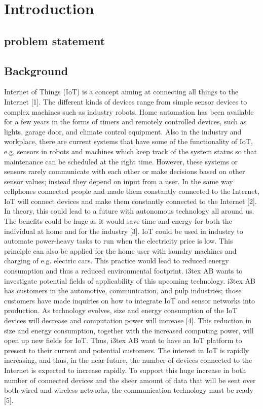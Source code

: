 \section{Introduction}

\subsection{problem statement}


\subsection{Background}

Internet of Things (IoT) is a concept aiming at connecting all things to the Internet [1].
The different kinds of devices range from simple sensor devices to complex machines such as industry robots.
Home automation has been available for a few years in the forms of timers and remotely controlled devices,
	such as lights,
	garage door,
	and climate control equipment.
Also in the industry and workplace,
	there are current systems that have some of the functionality of IoT,
	e.g,
	sensors in robots and machines which keep track of the system status so that maintenance can be scheduled at the right time.
However,
	these systems or sensors rarely communicate with each other or make decisions based on other sensor values;
	instead they depend on input from a user.
In the same way cellphones connected people and made them constantly connected to the Internet,
	IoT will connect devices and make them constantly connected to the Internet [2].
In theory,
	this could lead to a future with autonomous technology all around us.
The benefits could be huge as it would save time and energy for both the individual at home and for the industry [3].
IoT could be used in industry to automate power-heavy tasks to run when the electricity price is low.
This principle can also be applied for the home user with laundry machines and charging of e.g.
electric cars.
This practice would lead to reduced energy consumption and thus a reduced environmental footprint.
i3tex AB wants to investigate potential fields of applicability of this upcoming technology.
i3tex AB has customers in the automotive,
	communication,
	and pulp industries;
	those customers have made inquiries on how to integrate IoT and sensor networks into production.
As technology evolves,
	size and energy consumption of the IoT devices will decrease and computation power will increase [4].
This reduction in size and energy consumption,
	together with the increased computing power,
	will open up new fields for IoT.
Thus,
	i3tex AB want to have an IoT platform to present to their current and potential customers.
The interest in IoT is rapidly increasing,
	and thus,
	in the near future,
	the number of devices connected to the Internet is expected to increase rapidly.
To support this huge increase in both number of connected devices and the sheer amount of data that will be sent over both wired and wireless networks,
	the communication technology must be ready [5].
	
